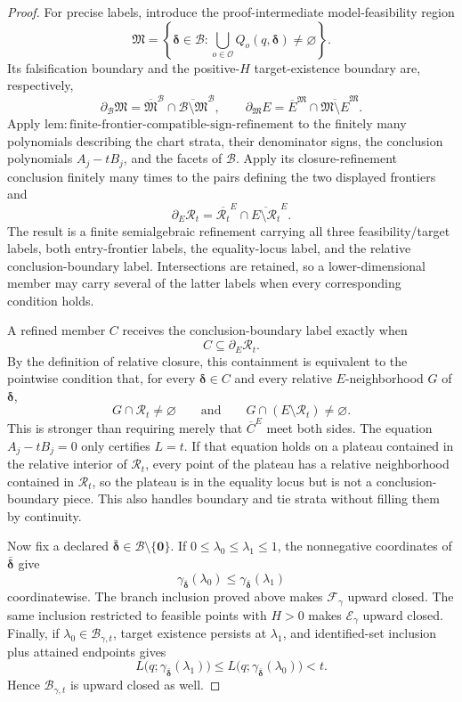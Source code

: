 \documentclass{article}
\begin{document}
\begin{proof}
For precise labels, introduce the proof-intermediate model-feasibility region
\[
 \mathfrak M
 =\left\{\boldsymbol\delta\in\mathcal B:
 \bigcup_{o\in\mathcal O}Q_o(q,\boldsymbol\delta)\neq\varnothing\right\}.
\]
Its falsification boundary and the positive-\(H\) target-existence boundary are, respectively,
\[
 \partial_{\mathcal B}\mathfrak M
 =\overline{\mathfrak M}^{\mathcal B}
  \cap\overline{\mathcal B\setminus\mathfrak M}^{\mathcal B},
 \qquad
 \partial_{\mathfrak M}E
 =\overline E^{\mathfrak M}
  \cap\overline{\mathfrak M\setminus E}^{\mathfrak M}.
\]
Apply \(\mathrm{lem:finite\text{-}frontier\text{-}compatible\text{-}sign\text{-}refinement}\) to the finitely many polynomials describing the chart strata, their denominator signs, the conclusion polynomials \(A_j-tB_j\), and the facets of \(\mathcal B\).  Apply its closure-refinement conclusion finitely many times to the pairs defining the two displayed frontiers and
\[
 \partial_E\mathcal R_t
 =\overline{\mathcal R_t}^{E}
  \cap\overline{E\setminus\mathcal R_t}^{E}.
\]
The result is a finite semialgebraic refinement carrying all three feasibility/target labels, both entry-frontier labels, the equality-locus label, and the relative conclusion-boundary label.  Intersections are retained, so a lower-dimensional member may carry several of the latter labels when every corresponding condition holds.

A refined member \(C\) receives the conclusion-boundary label exactly when
\[
 C\subseteq\partial_E\mathcal R_t.
\]
By the definition of relative closure, this containment is equivalent to the pointwise condition that, for every \(\boldsymbol\delta\in C\) and every relative \(E\)-neighborhood \(G\) of \(\boldsymbol\delta\),
\[
 G\cap\mathcal R_t\neq\varnothing
 \qquad\text{and}\qquad
 G\cap(E\setminus\mathcal R_t)\neq\varnothing.
\]
This is stronger than requiring merely that \(\overline C^{E}\) meet both sides.  The equation \(A_j-tB_j=0\) only certifies \(L=t\).  If that equation holds on a plateau contained in the relative interior of \(\mathcal R_t\), every point of the plateau has a relative neighborhood contained in \(\mathcal R_t\), so the plateau is in the equality locus but is not a conclusion-boundary piece.  This also handles boundary and tie strata without filling them by continuity.

Now fix a declared \(\bar{\boldsymbol\delta}\in\mathcal B\setminus\{\boldsymbol0\}\).  If \(0\leq\lambda_0\leq\lambda_1\leq1\), the nonnegative coordinates of \(\bar{\boldsymbol\delta}\) give
\[
 \gamma_{\bar{\boldsymbol\delta}}(\lambda_0)
 \leq
 \gamma_{\bar{\boldsymbol\delta}}(\lambda_1)
\]
coordinatewise.  The branch inclusion proved above makes \(\mathcal F_\gamma\) upward closed.  The same inclusion restricted to feasible points with \(H>0\) makes \(\mathcal E_\gamma\) upward closed.  Finally, if \(\lambda_0\in\mathcal B_{\gamma,t}\), target existence persists at \(\lambda_1\), and identified-set inclusion plus attained endpoints gives
\[
 L\bigl(q;\gamma_{\bar{\boldsymbol\delta}}(\lambda_1)\bigr)
 \leq
 L\bigl(q;\gamma_{\bar{\boldsymbol\delta}}(\lambda_0)\bigr)
 <t.
\]
Hence \(\mathcal B_{\gamma,t}\) is upward closed as well.


\end{proof}
\end{document}
